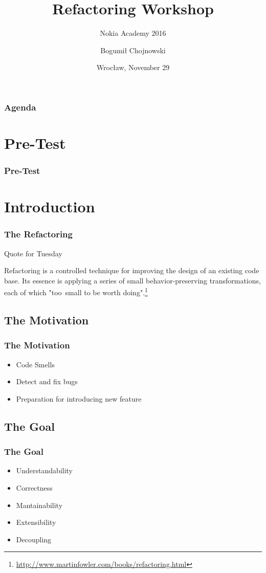 \documentclass[english]{beamer}
\title{Refactoring Workshop}
\subtitle{Nokia Academy 2016}
\author{Bogumił Chojnowski}
\institute[Nokia]{\textbf{Nokia}}
\date[Nov 29, 2016]{Wrocław, November 29}
\newenvironment{narrowblock}[1]{%
\begin{center}
\begin{minipage}{10.5cm}
\begin{block}{#1}
}{%
\end{block}
\end{minipage}
\end{center}
}
\begin{document}
\begin{frame}[fragile]
    \titlepage
\end{frame}


\begin{frame}
\frametitle{Agenda}
	\tableofcontents
\end{frame}

\section{Pre-Test}
\begin{frame}
\frametitle{Pre-Test}
\end{frame}

\section{Introduction}

\begin{frame}
\frametitle{The Refactoring}
\begin{narrowblock}{Quote for Tuesday}

Refactoring is a controlled technique for improving the design of an existing code base. Its essence is applying a series of small behavior-preserving transformations, each of which "too~small to be worth doing".\footnote{{\url{http://www.martinfowler.com/books/refactoring.html}}}
\end{narrowblock}
\end{frame}

\subsection{The Motivation}

\begin{frame}
\frametitle{The Motivation}
\begin{itemize}
\item<1-> Code Smells
\item<2-> Detect and fix bugs
\item<3-> Preparation for introducing new feature
\end{itemize}
\end{frame}

\subsection{The Goal}

\begin{frame}
\frametitle{The Goal}
\begin{itemize}[<+->]
\item Understandability
\item Correctness
\item Mantainability
\item Extensibility
\item Decoupling
\end{itemize}
\end{frame}
\end{document}
